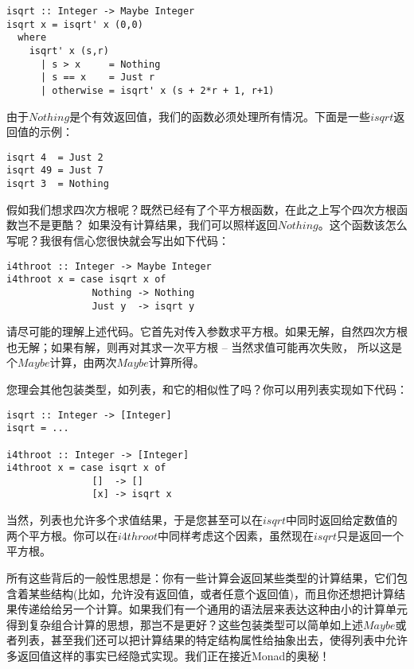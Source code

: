 \begin{lstlisting}
isqrt :: Integer -> Maybe Integer
isqrt x = isqrt' x (0,0)
  where
    isqrt' x (s,r)
      | s > x     = Nothing
      | s == x    = Just r
      | otherwise = isqrt' x (s + 2*r + 1, r+1)
\end{lstlisting}

由于$Nothing$是个有效返回值，我们的函数必须处理所有情况。下面是一些$isqrt$返回值的示例：

\begin{lstlisting}
isqrt 4  = Just 2
isqrt 49 = Just 7
isqrt 3  = Nothing
\end{lstlisting}

假如我们想求四次方根呢？既然已经有了个平方根函数，在此之上写个四次方根函数岂不是更酷？ 如果没有计算结果，我们可以照样返回$Nothing$。这个函数该怎么写呢？我很有信心您很快就会写出如下代码：

\begin{lstlisting}
i4throot :: Integer -> Maybe Integer
i4throot x = case isqrt x of
               Nothing -> Nothing
               Just y  -> isqrt y
\end{lstlisting}

请尽可能的理解上述代码。它首先对传入参数求平方根。如果无解，自然四次方根也无解；如果有解，则再对其求一次平方根 -- 当然求值可能再次失败， 所以这是个$Maybe$计算，由两次$Maybe$计算所得。

您理会其他包装类型，如列表，和它的相似性了吗？你可以用列表实现如下代码：

\begin{lstlisting}
isqrt :: Integer -> [Integer]
isqrt = ...

i4throot :: Integer -> [Integer]
i4throot x = case isqrt x of
               []  -> []
               [x] -> isqrt x
\end{lstlisting}

当然，列表也允许多个求值结果，于是您甚至可以在$isqrt$中同时返回给定数值的两个平方根。你可以在$i4throot$中同样考虑这个因素，虽然现在$isqrt$只是返回一个平方根。

所有这些背后的一般性思想是：你有一些计算会返回某些类型的计算结果，它们包含着某些结构(比如，允许没有返回值，或者任意个返回值)，而且你还想把计算结果传递给给另一个计算。如果我们有一个通用的语法层来表达这种由小的计算单元得到复杂组合计算的思想，那岂不是更好？这些包装类型可以简单如上述$Maybe$或者列表，甚至我们还可以把计算结果的特定结构属性给抽象出去，使得列表中允许多返回值这样的事实已经隐式实现。我们正在接近Monad的奥秘！
